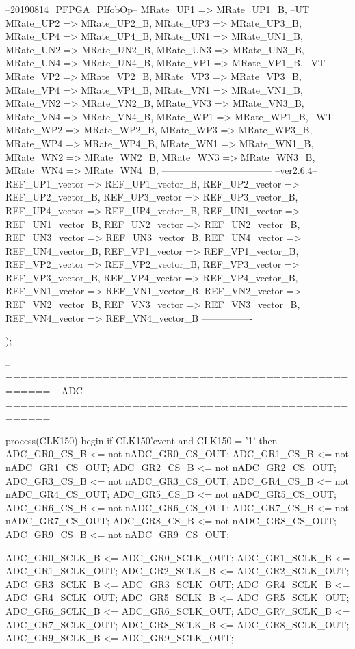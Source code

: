 \begin{mylisting}[language=VHDL,caption=トップモジュール,label=appF_Top_module_VHDL]
{{{		--20190814_PFPGA_PIfobOp--
			MRate_UP1	=>	MRate_UP1_B,		--UT
			MRate_UP2	=>	MRate_UP2_B,
			MRate_UP3	=>	MRate_UP3_B,
			MRate_UP4	=>	MRate_UP4_B,
			MRate_UN1	=>	MRate_UN1_B,
			MRate_UN2	=>	MRate_UN2_B,
			MRate_UN3	=>	MRate_UN3_B,
			MRate_UN4	=>	MRate_UN4_B,
			MRate_VP1	=>	MRate_VP1_B,		--VT
			MRate_VP2	=>	MRate_VP2_B,
			MRate_VP3	=>	MRate_VP3_B,
			MRate_VP4	=>	MRate_VP4_B,
			MRate_VN1	=>	MRate_VN1_B,
			MRate_VN2	=>	MRate_VN2_B,
			MRate_VN3	=>	MRate_VN3_B,
			MRate_VN4	=>	MRate_VN4_B,
			MRate_WP1	=>	MRate_WP1_B,		--WT
			MRate_WP2	=>	MRate_WP2_B,
			MRate_WP3	=>	MRate_WP3_B,
			MRate_WP4	=>	MRate_WP4_B,
			MRate_WN1	=>	MRate_WN1_B,
			MRate_WN2	=>	MRate_WN2_B,
			MRate_WN3	=>	MRate_WN3_B,
			MRate_WN4	=>	MRate_WN4_B,
		-----------------------------------
			--ver2.6.4--
			REF_UP1_vector => REF_UP1_vector_B,
			REF_UP2_vector => REF_UP2_vector_B,
			REF_UP3_vector => REF_UP3_vector_B,
			REF_UP4_vector	=> REF_UP4_vector_B,
			REF_UN1_vector => REF_UN1_vector_B,
			REF_UN2_vector	=> REF_UN2_vector_B,
			REF_UN3_vector	=> REF_UN3_vector_B,
			REF_UN4_vector	=> REF_UN4_vector_B,
			REF_VP1_vector => REF_VP1_vector_B,	
			REF_VP2_vector	=> REF_VP2_vector_B,
			REF_VP3_vector	=> REF_VP3_vector_B,
			REF_VP4_vector	=> REF_VP4_vector_B,
			REF_VN1_vector	=> REF_VN1_vector_B,
			REF_VN2_vector	=> REF_VN2_vector_B,
			REF_VN3_vector	=> REF_VN3_vector_B,
			REF_VN4_vector	=> REF_VN4_vector_B
			----------------
			
			);


-- ====================================================
-- ADC
-- ====================================================

	process(CLK150)
	begin
		if CLK150'event and CLK150 = '1' then
			ADC_GR0_CS_B	<= not nADC_GR0_CS_OUT;
			ADC_GR1_CS_B	<= not nADC_GR1_CS_OUT;
			ADC_GR2_CS_B	<= not nADC_GR2_CS_OUT;
			ADC_GR3_CS_B	<= not nADC_GR3_CS_OUT;
			ADC_GR4_CS_B	<= not nADC_GR4_CS_OUT;
			ADC_GR5_CS_B	<= not nADC_GR5_CS_OUT;
			ADC_GR6_CS_B	<= not nADC_GR6_CS_OUT;
			ADC_GR7_CS_B	<= not nADC_GR7_CS_OUT;
			ADC_GR8_CS_B	<= not nADC_GR8_CS_OUT;
			ADC_GR9_CS_B	<= not nADC_GR9_CS_OUT;
			
			ADC_GR0_SCLK_B	<= ADC_GR0_SCLK_OUT;
			ADC_GR1_SCLK_B	<= ADC_GR1_SCLK_OUT;
			ADC_GR2_SCLK_B	<= ADC_GR2_SCLK_OUT;
			ADC_GR3_SCLK_B	<= ADC_GR3_SCLK_OUT;
			ADC_GR4_SCLK_B	<= ADC_GR4_SCLK_OUT;
			ADC_GR5_SCLK_B	<= ADC_GR5_SCLK_OUT;
			ADC_GR6_SCLK_B	<= ADC_GR6_SCLK_OUT;
			ADC_GR7_SCLK_B	<= ADC_GR7_SCLK_OUT;
			ADC_GR8_SCLK_B	<= ADC_GR8_SCLK_OUT;
			ADC_GR9_SCLK_B	<= ADC_GR9_SCLK_OUT;
			
}}}
\end{mylisting}
